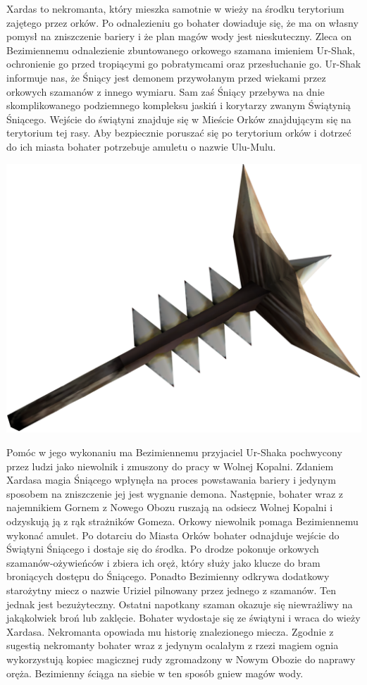 \documentclass[11pt,polish, openany]{book}
\begin{document}
Xardas to nekromanta, który mieszka samotnie w wieży na środku terytorium zajętego przez orków. Po odnalezieniu go bohater dowiaduje się, że ma on własny pomysł na zniszczenie bariery i że plan magów wody jest nieskuteczny. Zleca on Bezimiennemu odnalezienie zbuntowanego orkowego szamana imieniem Ur-Shak, ochronienie go przed tropiącymi go pobratymcami oraz przesłuchanie go. Ur-Shak informuje nas, że Śniący jest demonem przywołanym przed wiekami przez orkowych szamanów z innego wymiaru. Sam zaś Śniący przebywa na dnie skomplikowanego podziemnego kompleksu jaskiń i korytarzy zwanym Świątynią Śniącego.
\newpage Wejście do świątyni znajduje się w Mieście Orków znajdującym się na terytorium tej rasy. Aby bezpiecznie poruszać się po terytorium orków i dotrzeć do ich miasta bohater potrzebuje amuletu o nazwie Ulu-Mulu. 
\newline
\begin{center}
	\includegraphics[scale=0.2]{umumulu}
\end{center}
Pomóc w jego wykonaniu ma Bezimiennemu przyjaciel Ur-Shaka pochwycony przez ludzi jako niewolnik i zmuszony do pracy w Wolnej Kopalni. Zdaniem Xardasa magia Śniącego wpłynęła na proces powstawania bariery i jedynym sposobem na zniszczenie jej jest wygnanie demona. Następnie, bohater wraz z najemnikiem Gornem z Nowego Obozu ruszają na odsiecz Wolnej Kopalni i odzyskują ją z rąk strażników Gomeza. Orkowy niewolnik pomaga Bezimiennemu wykonać amulet.
Po dotarciu do Miasta Orków bohater odnajduje wejście do Świątyni Śniącego i dostaje się do środka. Po drodze pokonuje orkowych szamanów-ożywieńców i zbiera ich oręż, który służy jako klucze do bram broniących dostępu do Śniącego. Ponadto Bezimienny odkrywa dodatkowy starożytny miecz o nazwie Uriziel pilnowany przez jednego z szamanów. Ten jednak jest bezużyteczny. Ostatni napotkany szaman okazuje się niewrażliwy na jakąkolwiek broń lub zaklęcie. Bohater wydostaje się ze świątyni i wraca do wieży Xardasa. Nekromanta opowiada mu historię znalezionego miecza. Zgodnie z sugestią nekromanty bohater wraz z jedynym ocalałym z rzezi magiem ognia wykorzystują kopiec magicznej rudy zgromadzony w Nowym Obozie do naprawy oręża. Bezimienny ściąga na siebie w ten sposób gniew magów wody.
\end{document}
